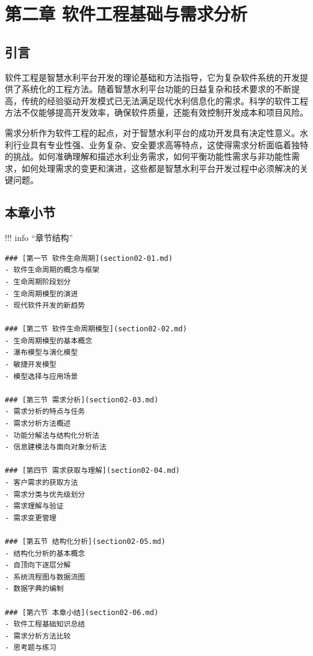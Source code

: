\hypertarget{ux7b2cux4e8cux7ae0-ux8f6fux4ef6ux5de5ux7a0bux57faux7840ux4e0eux9700ux6c42ux5206ux6790}{%
\section{第二章 软件工程基础与需求分析}\label{ux7b2cux4e8cux7ae0-ux8f6fux4ef6ux5de5ux7a0bux57faux7840ux4e0eux9700ux6c42ux5206ux6790}}


\hypertarget{ux5f15ux8a00}{%
\subsection{引言}\label{ux5f15ux8a00}}

软件工程是智慧水利平台开发的理论基础和方法指导，它为复杂软件系统的开发提供了系统化的工程方法。随着智慧水利平台功能的日益复杂和技术要求的不断提高，传统的经验驱动开发模式已无法满足现代水利信息化的需求。科学的软件工程方法不仅能够提高开发效率，确保软件质量，还能有效控制开发成本和项目风险。

需求分析作为软件工程的起点，对于智慧水利平台的成功开发具有决定性意义。水利行业具有专业性强、业务复杂、安全要求高等特点，这使得需求分析面临着独特的挑战。如何准确理解和描述水利业务需求，如何平衡功能性需求与非功能性需求，如何处理需求的变更和演进，这些都是智慧水利平台开发过程中必须解决的关键问题。

\hypertarget{ux672cux7ae0ux5c0fux8282}{%
\subsection{本章小节}\label{ux672cux7ae0ux5c0fux8282}}

!!! info ``章节结构''

\begin{verbatim}
### [第一节 软件生命周期](section02-01.md)
- 软件生命周期的概念与框架
- 生命周期阶段划分
- 生命周期模型的演进
- 现代软件开发的新趋势

### [第二节 软件生命周期模型](section02-02.md)
- 生命周期模型的基本概念
- 瀑布模型与演化模型
- 敏捷开发模型
- 模型选择与应用场景

### [第三节 需求分析](section02-03.md)
- 需求分析的特点与任务
- 需求分析方法概述
- 功能分解法与结构化分析法
- 信息建模法与面向对象分析法

### [第四节 需求获取与理解](section02-04.md)
- 客户需求的获取方法
- 需求分类与优先级划分
- 需求理解与验证
- 需求变更管理

### [第五节 结构化分析](section02-05.md)
- 结构化分析的基本概念
- 自顶向下逐层分解
- 系统流程图与数据流图
- 数据字典的编制

### [第六节 本章小结](section02-06.md)
- 软件工程基础知识总结
- 需求分析方法比较
- 思考题与练习
\end{verbatim}


